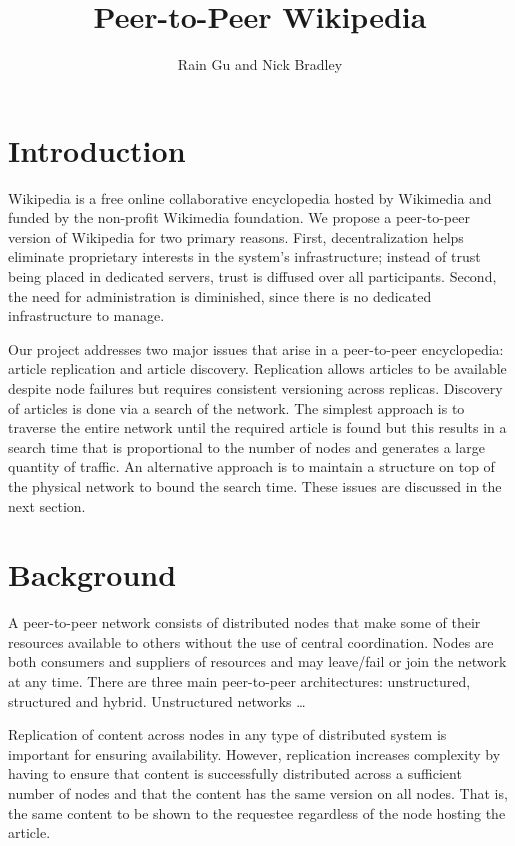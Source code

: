 \documentclass{article}
\title{Peer-to-Peer Wikipedia}
\author{Rain Gu and Nick Bradley}
\begin{document}
\maketitle

\section{Introduction}
Wikipedia is a free online collaborative encyclopedia hosted by Wikimedia and
funded by the non-profit Wikimedia foundation. We propose a peer-to-peer version
of Wikipedia for two primary reasons. First, decentralization helps eliminate
proprietary interests in the system’s infrastructure; instead of trust being
placed in dedicated servers, trust is diffused over all participants. Second,
the need for administration is diminished, since there is no dedicated
infrastructure to manage.

Our project addresses two major issues that arise in a peer-to-peer encyclopedia:
article replication and article discovery. Replication allows articles to be
available despite node failures but requires consistent versioning across replicas.
Discovery of articles is done via a search of the network. The simplest approach
is to traverse the entire network until the required article is found but this
results in a search time that is proportional to the number of nodes and generates
a large quantity of traffic. An alternative approach is to maintain a structure
on top of the physical network to bound the search time. These issues are discussed
in the next section.

\section{Background}
A peer-to-peer network consists of distributed nodes that make some of their
resources available to others without the use of central coordination. Nodes are
both consumers and suppliers of resources and may leave/fail or join the network
at any time. There are three main peer-to-peer architectures: unstructured,
structured and hybrid. Unstructured networks …

Replication of content across nodes in any type of distributed system is important
for ensuring availability. However, replication increases complexity by having
to ensure that content is successfully distributed across a sufficient number of
nodes and that the content has the same version on all nodes. That is, the same
content to be shown to the requestee regardless of the node hosting the article.
\end{document}
